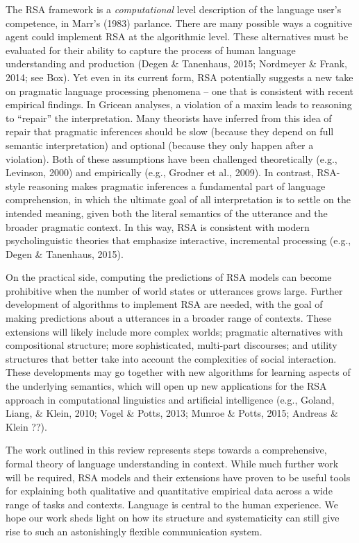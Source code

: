 \documentclass[]{elsarticle}
\begin{document}
The RSA framework is a \emph{computational} level description of the
language user's competence, in Marr's (1983) parlance. There are many
possible ways a cognitive agent could implement RSA at the algorithmic
level. These alternatives must be evaluated for their ability to capture
the process of human language understanding and production (Degen \&
Tanenhaus, 2015; Nordmeyer \& Frank, 2014; see Box). Yet even in its
current form, RSA potentially suggests a new take on pragmatic language
processing phenomena -- one that is consistent with recent empirical
findings. In Gricean analyses, a violation of a maxim leads to reasoning
to ``repair'' the interpretation. Many theorists have inferred from this
idea of repair that pragmatic inferences should be slow (because they
depend on full semantic interpretation) and optional (because they only
happen after a violation). Both of these assumptions have been
challenged theoretically (e.g., Levinson, 2000) and empirically (e.g.,
Grodner et al., 2009). In contrast, RSA-style reasoning makes pragmatic
inferences a fundamental part of language comprehension, in which the
ultimate goal of all interpretation is to settle on the intended
meaning, given both the literal semantics of the utterance and the
broader pragmatic context. In this way, RSA is consistent with modern
psycholinguistic theories that emphasize interactive, incremental
processing (e.g., Degen \& Tanenhaus, 2015).

On the practical side, computing the predictions of RSA models can
become prohibitive when the number of world states or utterances grows
large. Further development of algorithms to implement RSA are needed,
with the goal of making predictions about a utterances in a broader
range of contexts. These extensions will likely include more complex
worlds; pragmatic alternatives with compositional structure; more
sophisticated, multi-part discourses; and utility structures that better
take into account the complexities of social interaction. These
developments may go together with new algorithms for learning aspects of
the underlying semantics, which will open up new applications for the
RSA approach in computational linguistics and artificial intelligence
(e.g., Goland, Liang, \& Klein, 2010; Vogel \& Potts, 2013; Munroe \&
Potts, 2015; Andreas \& Klein ??).

The work outlined in this review represents steps towards a
comprehensive, formal theory of language understanding in context. While
much further work will be required, RSA models and their extensions have
proven to be useful tools for explaining both qualitative and
quantitative empirical data across a wide range of tasks and contexts.
Language is central to the human experience. We hope our work sheds
light on how its structure and systematicity can still give rise to such
an astonishingly flexible communication system.
\end{document}
